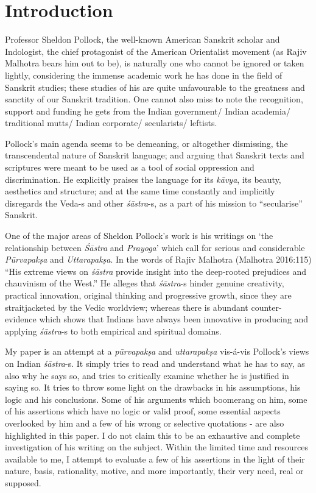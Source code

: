 \vskip -12pt

\section*{Introduction}

Professor Sheldon Pollock, the well-known American Sanskrit scholar and Indologist, the chief protagonist of the American Orientalist movement (as Rajiv Malhotra bears him out to be), is naturally one who cannot be ignored or taken lightly, considering the immense academic work he has done in the field of Sanskrit studies; these studies of his are quite unfavourable to the greatness and sanctity of our Sanskrit tradition. One cannot also miss to note the recognition, support and funding he gets from the Indian government/ Indian academia/ traditional mutts/ Indian corporate/ secularists/ leftists.

Pollock's main agenda seems to be demeaning, or altogether dismissing, the transcendental nature of Sanskrit language; and arguing that Sanskrit texts and scriptures were meant to be used as a tool of social oppression and discrimination. He explicitly praises the language for its {\sl kāvya}, its beauty, aesthetics and structure; and at the same time constantly and implicitly disregards the Veda-s and other {\sl śāstra}-s, as a part of his mission to ``secularise'' Sanskrit. 

One of the major areas of Sheldon Pollock's work is his writings on `the relationship between {\sl Śāstra} and {\sl Prayoga}' which call for serious and considerable {\sl Pūrvapakṣa} and {\sl Uttarapakṣa}. In the words of Rajiv Malhotra (Malhotra 2016:115) ``His extreme views on {\sl śāstra} provide insight into the deep-rooted prejudices and chauvinism of the West.'' He alleges that {\sl śāstra}-s hinder genuine creativity, practical innovation, original thinking and progressive growth, since they are straitjacketed by the Vedic worldview; whereas there is abundant counter-evidence which shows that Indians have always been innovative in producing and applying {\sl śāstra}-s to both empirical and spiritual domains.

My paper is an attempt at a {\sl pūrvapakṣa} and {\sl uttarapakṣa} vis-á-vis Pollock's views on Indian {\sl śāstra}-s. It simply tries to read and understand what he has to say, as also why he says so, and tries to critically examine whether he is justified in saying so. It tries to throw some light on the drawbacks in his assumptions, his logic and his conclusions. Some of his arguments which boomerang on him, some of his assertions which have no logic or valid proof, some essential aspects overlooked by him and a few of his wrong or selective quotations  - are also highlighted in this paper. I do not claim this to be an exhaustive and complete investigation of his writing on the subject. Within the limited time and resources available to me, I attempt to evaluate a few of his assertions in the light of their nature, basis, rationality, motive, and more importantly, their very need, real or supposed.

